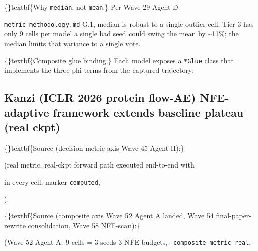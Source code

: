 \documentclass{article}
\begin{document}
\{\}textbf\{Why \texttt{median}, not \texttt{mean}.\} Per Wave 29 Agent D

\texttt{metric-methodology.md} G.1, median is robust to a single outlier cell. Tier 3 has only 9 cells per model  a single bad seed could swing the mean by \textasciitilde{}11\%; the median limits that variance to a single vote.

\{\}textbf\{Composite glue binding.\} Each model exposes a \texttt{*Glue} class that implements the three phi terms from the captured trajectory:

\begin{table}[ht]
\centering
\small
{}%
\end{table}

\subsection{Kanzi (ICLR 2026 protein flow-AE)  NFE-adaptive framework extends baseline plateau (real ckpt)}
\{\}textbf\{Source (decision-metric axis  Wave 45 Agent H):\}

 (real metric, real-ckpt forward path executed end-to-end with

 in every cell, marker \texttt{computed},

).

\{\}textbf\{Source (composite axis  Wave 52 Agent A landed, Wave 54 final-paper-rewrite consolidation, Wave 58 NFE-scan):\}

 (Wave 52 Agent A; 9 cells = 3 seeds  3 NFE budgets, \texttt{--composite-metric real},
\end{document}
